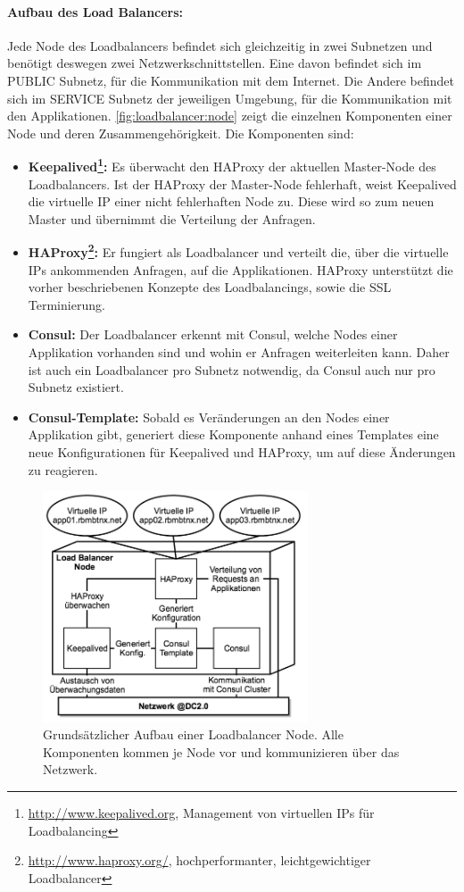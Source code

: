 \paragraph{Aufbau des Load Balancers:}
Jede Node des Loadbalancers befindet sich gleichzeitig in zwei Subnetzen  und benötigt deswegen zwei Netzwerkschnittstellen. Eine davon befindet sich im PUBLIC Subnetz, für die Kommunikation mit dem Internet. Die Andere befindet sich im SERVICE Subnetz der jeweiligen Umgebung, für die Kommunikation mit den Applikationen. \autoref{fig:loadbalancer:node} zeigt die einzelnen Komponenten einer Node und deren Zusammengehörigkeit.
Die Komponenten sind:
\begin{itemize}
	\item \textbf{Keepalived\footnote{\url{http://www.keepalived.org}, Management von virtuellen IPs für Loadbalancing}:} Es überwacht den HAProxy der aktuellen Master-Node des Loadbalancers. Ist der HAProxy der Master-Node fehlerhaft, weist Keepalived die virtuelle IP einer nicht fehlerhaften Node zu. Diese wird so zum neuen Master und übernimmt die Verteilung der Anfragen.
	\item \textbf{HAProxy\footnote{\url{http://www.haproxy.org/}, hochperformanter, leichtgewichtiger Loadbalancer}:} Er fungiert als Loadbalancer und verteilt die, über die virtuelle IPs ankommenden Anfragen, auf die Applikationen. HAProxy unterstützt die vorher beschriebenen Konzepte des Loadbalancings, sowie die SSL Terminierung.
	\item \textbf{Consul:} Der Loadbalancer erkennt mit Consul, welche Nodes einer Applikation vorhanden sind und wohin er Anfragen weiterleiten kann. Daher ist auch ein Loadbalancer pro Subnetz notwendig, da Consul auch nur pro Subnetz existiert.
	\item \textbf{Consul-Template:} Sobald es Veränderungen an den Nodes einer Applikation gibt, generiert diese Komponente anhand eines Templates eine neue Konfigurationen für Keepalived und HAProxy, um auf diese Änderungen zu reagieren.
\end{itemize}

\begin{figure}[ht]
	\centering
	\includegraphics[width=0.7\textwidth]{img/loadbalancer_node.png}
	\caption[Aufbau einer Loadbalancer Node]{Grundsätzlicher Aufbau einer Loadbalancer Node. Alle Komponenten kommen je Node vor und kommunizieren über das Netzwerk.}
	\label{fig:loadbalancer:node}
\end{figure} 

